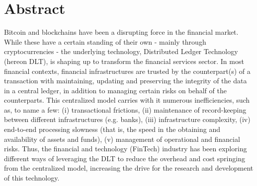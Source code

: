 
\newpage

\mbox{}\vfill
\chapter*{\centering Abstract}

Bitcoin and blockchains have been a disrupting force in the financial market. While these have a certain standing of their own - mainly through cryptocurrencies - the underlying technology, Distributed Ledger Technology (hereon DLT), is shaping up to transform the financial services sector. 
In most financial contexts, financial infrastructures are trusted by the counterpart(s) of a transaction with maintaining, updating and preserving the integrity of the data in a central ledger, in addition to managing certain risks on behalf of the counterparts.
This centralized model carries with it numerous inefficiencies, such as, to name a few: (i) transactional frictions, (ii) maintenance of record-keeping between different infrastructures (e.g. banks),  (iii) infrastructure complexity, (iv) end-to-end processing slowness (that is, the speed in the obtaining and availability of assets and funds), (v) management of operational and financial risks. 
Thus, the financial and technology (FinTech) industry has been exploring different ways of leveraging the DLT to reduce the overhead and cost springing from the centralized model, increasing the drive for the research and development of this technology.



\iffalse 
// appunti
DLT could reduce the traditional reliance on a central ledger managed by a trusted
entity for holding and transferring funds and other financial assets.
transparency and immutability in transaction record-keeping?
improving resilience through distributed data management?
\fi
\mbox{}\vfill
